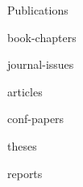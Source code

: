 \documentclass{article}
\begin{document}
\begin{cv}
\begin{cvlist}{Publications}
\item[Book Chapters]
  \begin{btSect}{book-chapters}
    \btPrintAll
  \end{btSect}

\item[Edited Journal Issues]
  \begin{btSect}{journal-issues}
    \btPrintAll
  \end{btSect}

\item[Ref.~Jour.~Papers]
  \begin{btSect}{articles}
    \btPrintAll
  \end{btSect}

\item[Ref.~Conf.~Papers]
  \begin{btSect}{conf-papers}
    \btPrintAll
  \end{btSect}

\item[Theses]
  \begin{btSect}{theses}
    \btPrintAll
  \end{btSect}

\item[Reports]
  \begin{btSect}{reports}
    \btPrintAll
  \end{btSect}

\end{cvlist}


\end{cv}
\end{document}
